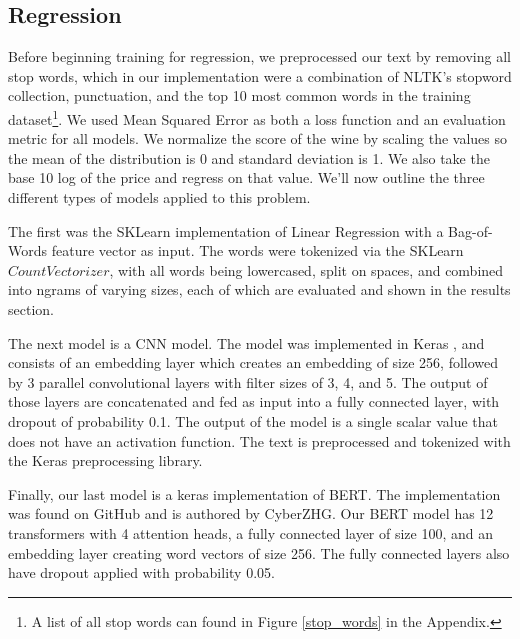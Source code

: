 \documentclass[12pt]{IEEEtran}
\begin{document}
\subsection{Regression}
    Before beginning training for regression, we preprocessed our text by removing all stop words, which in our implementation were a combination of NLTK's stopword collection, punctuation, and the top 10 most common words in the training dataset\footnote{A list of all stop words can found in Figure \ref{stop_words} in the Appendix.}. We used Mean Squared Error as both a loss function and an evaluation metric for all models. We normalize the score of the wine by scaling the values so the mean of the distribution is 0 and standard deviation is 1. We also take the base 10 log of the price and regress on that value. We'll now outline the three different types of models applied to this problem.\par
    The first was the SKLearn implementation of Linear Regression with a Bag-of-Words feature vector as input. The words were tokenized via the SKLearn $CountVectorizer$\cite{sklearn}, with all words being lowercased, split on spaces, and combined into ngrams of varying sizes, each of which are evaluated and shown in the results section. \par
    The next model is a CNN model. The model was implemented in Keras \cite{keras}, and consists of an embedding layer which creates an embedding of size 256, followed by 3 parallel convolutional layers with filter sizes of 3, 4, and 5. The output of those layers are concatenated and fed as input into a fully connected layer, with dropout of probability 0.1. The output of the model is a single scalar value that does not have an activation function. The text is preprocessed and tokenized with the Keras preprocessing library. \par
    Finally, our last model is a keras implementation of BERT. The implementation was found on GitHub and is authored by CyberZHG\cite{keras_bert}. Our BERT model has 12 transformers with 4 attention heads, a fully connected layer of size 100, and an embedding layer creating word vectors of size 256. The fully connected layers also have dropout applied with probability 0.05.
\end{document}
